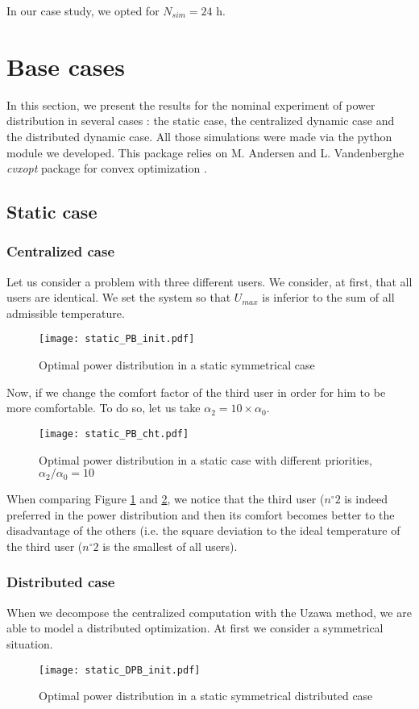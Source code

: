\documentclass[conference, peerreview]{IEEEtran}
\begin{document}
In our case study, we opted for $N_{sim} = 24$ h.  

\section{Base cases}
In this section, we present the results for the nominal experiment of power distribution in several cases : the static case, the centralized dynamic case and the distributed dynamic case. All those simulations were made via the python module we developed. This package relies on M. Andersen and L. Vandenberghe \textit{cvxopt} package for convex optimization \cite{Boyd}.

\subsection{Static case}
\subsubsection{Centralized case}

Let us consider a problem with three different users. We consider, at first, that all users are identical. We set the system so that $U_{max}$ is inferior to the sum of all admissible temperature. 
\begin{figure}[H]
\centering
\texttt{[image: static\_PB\_init.pdf]}
\caption{Optimal power distribution in a static symmetrical case}
\label{statPBinit}
\end{figure}

Now, if we change the comfort factor of the third user in order for him to be more comfortable. To do so, let us take $\alpha_2 = 10\times  \alpha_0 $.

\begin{figure}[H]
\centering
\texttt{[image: static\_PB\_cht.pdf]}
\caption{Optimal power distribution in a static case with different priorities, $\alpha_2 / \alpha_0 = 10$ }
\label{statPBcom}
\end{figure}

When comparing Figure \ref{statPBinit} and \ref{statPBcom}, we notice that the third user ($n^{\circ}2$ is indeed preferred in the power distribution and then its comfort becomes better to the disadvantage of the others (i.e. the square deviation to the ideal temperature of the third user ($n^{\circ}2$ is the smallest of all users).

\subsubsection{Distributed case}
When we decompose the centralized computation with the Uzawa method, we are able to model a distributed optimization. At first we consider a symmetrical situation.  
\begin{figure}[H]
\centering
\texttt{[image: static\_DPB\_init.pdf]}
\caption{Optimal power distribution in a static symmetrical distributed case}
\label{statDPBinit}
\end{figure}
\end{document}
